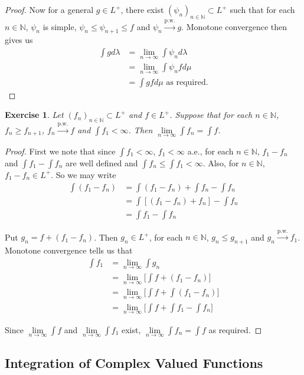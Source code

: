 \documentclass[12pt]{amsart}
\newtheorem{ex}[thm]{Exercise}
\newcommand{\lam}{\lambda}
\newcommand{\N}{\mathbb{N}}
\newcommand{\limn}{\lim \limits_{n \rightarrow \infty}}
\begin{document}
\begin{proof}
Now for a general $g \in L^+$, there exist $(\psi_n)_{n \in \N} \subset L^+$ such that for each $n \in \N$, $\psi_n$ is simple, $\psi_n \leq \psi_{n+1} \leq f$ and $\psi_n \xrightarrow{\text{p.w.}} g$. Monotone convergence then gives us 
\begin{align*}
\int g d\lam 
&= \limn \int \psi_n d\lam\\
&= \limn \int \psi_n f d\mu\\
&= \int g f d\mu \text{ as required.}
\end{align*}
\end{proof}

\begin{ex}
Let $(f_n)_{n \in \N} \subset L^+$ and $f \in L^+$. Suppose that for each $n \in \N$, $f_n \geq f_{n+1}$, $f_n \xrightarrow{\text{p.w.}} f$ and $\int f_1 < \infty$. Then $\limn \int f_n = \int f$.
\end{ex}

\begin{proof}
First we note that since $\int f_1 < \infty$, $f_1 < \infty$ a.e., for each $n \in \N$, $f_1 - f_n$ and $\int f_1 - \int f_n$ are well defined and $\int f_n \leq \int f_1 < \infty$. Also, for $n \in \N$, $f_1 -f_n \in L^+$. So we may write 
\begin{align*}
\int (f_1 - f_n) 
&= \int (f_1 - f_n)  + \int f_n - \int f_n\\
&= \int [(f_1 - f_n) + f_n] - \int f_n\\
&= \int f_1 - \int f_n
\end{align*}

Put $g_n = f + (f_1 - f_n)$. Then $g_n \in L^+$, for each $n \in \N$, $g_n \leq g_{n+1}$ and $g_n \xrightarrow{\text{p.w.}} f_1$. Monotone convergence tells us that 
\begin{align*}
\int f_1 
&= \limn \int g_n\\
&= \limn \bigg[\int f + (f_1-f_n)\bigg]\\
&= \limn \bigg[ \int f + \int (f_1-f_n)\bigg] \\
&= \limn \bigg[ \int f + \int f_1- \int f_n\bigg] 
\end{align*}

Since $\limn \int f$ and $\limn \int f_1$ exist, $\limn \int f_n = \int f$ as required.  

\end{proof}

\subsection{Integration of Complex Valued Functions}
\end{document}

